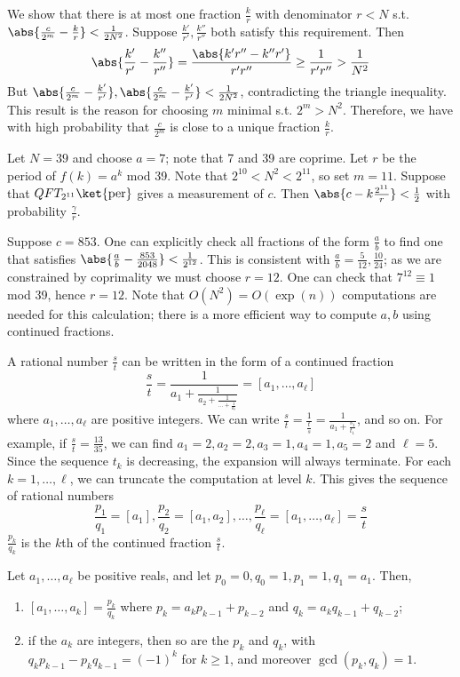 We show that there is at most one fraction $\frac{k}{r}$ with denominator $r < N$ s.t. $\abs{\frac{c}{2^m} - \frac{k}{r}} < \frac{1}{2N^2}$.
Suppose $\frac{k'}{r'}, \frac{k''}{r''}$ both satisfy this requirement.
Then
\[ \abs{\frac{k'}{r'} - \frac{k''}{r''}} = \frac{\abs{k'r'' - k''r'}}{r'r''} \geq \frac{1}{r'r''} > \frac{1}{N^2} \]
But $\abs{\frac{c}{2^m} - \frac{k'}{r'}}, \abs{\frac{c}{2^m} - \frac{k'}{r'}} < \frac{1}{2N^2}$, contradicting the triangle inequality.
This result is the reason for choosing $m$ minimal s.t. $2^m > N^2$.
Therefore, we have with high probability that $\frac{c}{2^m}$ is close to a unique fraction $\frac{k}{r}$.
\begin{example}
    Let $N = 39$ and choose $a = 7$; note that 7 and 39 are coprime.
    Let $r$ be the period of $f(k) = a^k$ mod 39.
    Note that $2^{10} < N^2 < 2^{11}$, so set $m = 11$.
    Suppose that $QFT_{2^{11}} \ket{\mathrm{per}}$ gives a measurement of $c$.
    Then $\abs{c - k \frac{2^{11}}{r}} < \frac{1}{2}$ with probability $\frac{\gamma}{r}$.

    Suppose $c = 853$.
    One can explicitly check all fractions of the form $\frac{a}{b}$ to find one that satisfies $\abs{\frac{a}{b} - \frac{853}{2048}} < \frac{1}{2^{12}}$.
    This is consistent with $\frac{a}{b} = \frac{5}{12}, \frac{10}{24}$; as we are constrained by coprimality we must choose $r = 12$.
    One can check that $7^{12} \equiv 1$ mod 39, hence $r = 12$.
    Note that $O(N^2) = O(\exp(n))$ computations are needed for this calculation; there is a more efficient way to compute $a, b$ using continued fractions.
\end{example}
A rational number $\frac{s}{t}$ can be written in the form of a continued fraction
\[ \frac{s}{t} = \frac{1}{a_1 + \frac{1}{a_2 + \frac{1}{\dots + \frac{1}{a_\ell}}}} = [a_1, \dots, a_\ell] \]
where $a_1, \dots, a_\ell$ are positive integers.
We can write $\frac{s}{t} = \frac{1}{\frac{t}{s}} = \frac{1}{a_1 + \frac{s_1}{t_1}}$, and so on.
For example, if $\frac{s}{t} = \frac{13}{35}$, we can find $a_1 = 2, a_2 = 2, a_3 = 1, a_4 = 1, a_5 = 2$ and $\ell = 5$.
Since the sequence $t_k$ is decreasing, the expansion will always terminate.
For each $k = 1, \dots, \ell$, we can truncate the computation at level $k$.
This gives the sequence of rational numbers
\[ \frac{p_1}{q_1} = [a_1], \frac{p_2}{q_2} = [a_1, a_2], \dots, \frac{p_\ell}{q_\ell} = [a_1, \dots, a_\ell] = \frac{s}{t} \]
$\frac{p_k}{q_k}$ is the $k$th  of the continued fraction $\frac{s}{t}$.
\begin{lemma}
    Let $a_1, \dots, a_\ell$ be positive reals, and let $p_0 = 0, q_0 = 1, p_1 = 1, q_1 = a_1$.
    Then,
    \begin{enumerate}
        \item $[a_1, \dots, a_k] = \frac{p_k}{q_k}$ where $p_k = a_k p_{k-1} + p_{k-2}$ and $q_k = a_k q_{k-1} + q_{k-2}$;
        \item if the $a_k$ are integers, then so are the $p_k$ and $q_k$, with $q_k p_{k-1} - p_k q_{k-1} = (-1)^k$ for $k \geq 1$, and moreover $\gcd(p_k, q_k) = 1$.
    \end{enumerate}
\end{lemma}
